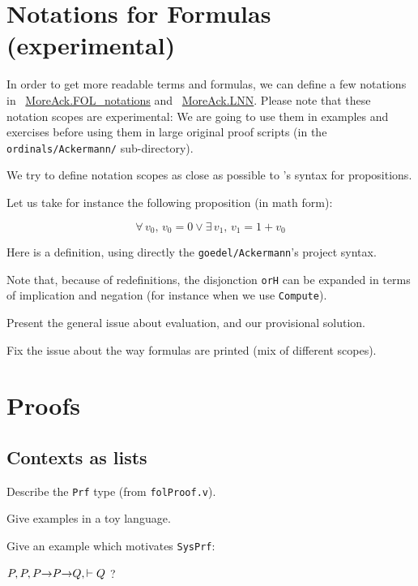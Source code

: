 \section{Notations for Formulas (experimental)}

In order to get more readable terms and formulas, we can define a few notations in ~\href{../theories/html/hydras.MoreAck.FOL_notations.html}{MoreAck.FOL\_notations} and
~\href{../theories/html/hydras.MoreAck.LNN.html}{MoreAck.LNN}.
Please note that these notation scopes are experimental: We are going to use them in examples and exercises before using them in large original proof scripts (in the \texttt{ordinals/Ackermann/} sub-directory).

We try to define notation scopes as close as possible to \coq's syntax for propositions.

Let us take for instance the following proposition (in math form):

$$\forall\, v_0,\, v_0=0\vee \exists\,v_1,\,v_1=1+v_0$$

Here is a definition, using directly the \texttt{goedel/Ackermann}'s project syntax.


Note that, because of redefinitions, the disjonction \texttt{orH}
can be expanded in terms of  implication and negation (for instance when we use \texttt{Compute}).

\begin{todo}
  Present the general issue about evaluation, and our provisional solution.
\end{todo}


\begin{todo}
Fix the issue about the way formulas are printed (mix of different scopes).
\end{todo}





\section{Proofs}

\subsection{Contexts as lists}
\begin{todo}
Describe the \texttt{Prf} type (from \texttt{folProof.v}).

Give examples in a toy language.

Give an example which motivates \texttt{SysPrf}:

$P,P , P\mbox{$\rightarrow$} P \mbox{$\rightarrow$} Q, \vdash Q$ ?
\end{todo}


